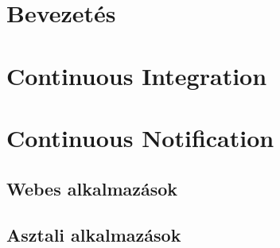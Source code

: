 \documentclass[12pt,a4paper,english,magyar,oneside]{report}
\begin{document}


\setcounter{tocdepth}{2} %
\tableofcontents %
\printnomenclature[2.5cm]

\chapter{Bevezetés}


\chapter{Continuous Integration}


\chapter{Continuous Notification}


\section{Webes alkalmazások}


\section{Asztali alkalmazások}


%

\newpage

\printbibliography


\end{document}
